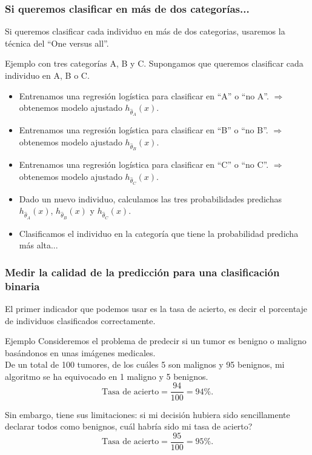 \documentclass{beamer}
\begin{document}
\begin{frame}\frametitle{Si queremos clasificar en más de dos categorías...}
  Si queremos clasificar cada individuo en más de dos categorias, usaremos la técnica del ``One versus all''.\\ 
  {\footnotesize
  \begin{block}{Ejemplo con tres categorías A, B y C.}
    Supongamos que queremos clasificar cada individuo en A, B o C.
    \begin{itemize}
    \item<3-> Entrenamos una regresión logística para clasificar en ``A'' o ``no A''. $\Rightarrow$ obtenemos modelo ajustado $h_{\hat{\theta}_{A}}(x)$.
    \item<4-> Entrenamos una regresión logística para clasificar en ``B'' o ``no B''. $\Rightarrow$ obtenemos modelo ajustado $h_{\hat{\theta}_{B}}(x)$.
    \item<5-> Entrenamos una regresión logística para clasificar en ``C'' o ``no C''. $\Rightarrow$ obtenemos modelo ajustado $h_{\hat{\theta}_{C}}(x)$.
    \item<6-> Dado un nuevo individuo, calculamos las tres probabilidades predichas $h_{\hat{\theta}_{A}}(x)$, $h_{\hat{\theta}_{B}}(x)$ y $h_{\hat{\theta}_{C}}(x)$.
    \item<7-> Clasificamos el individuo en la categoría que tiene la probabilidad predicha más alta...
    \end{itemize}
  \end{block}
  }
\end{frame}
\begin{frame}
  \frametitle{Medir la calidad de la predicción para una clasificación
    binaria}
  El primer indicador que podemos usar es la \alert{tasa de acierto}, es
    decir el porcentaje de individuos clasificados correctamente.
 
  \footnotesize
  \begin{block}{Ejemplo}
  Consideremos el problema de predecir si un tumor es benigno o
  maligno basándonos en unas imágenes medicales. \\ 
  De un total de 100 tumores, de los cuáles 5 son malignos y 95
  benignos, mi algoritmo se ha equivocado en 1 maligno y 5 benignos.
  $$\mbox{Tasa de acierto} = \frac {94} {100} = 94\%.$$
\end{block}
Sin embargo, tiene sus limitaciones: si mi decisión hubiera sido
sencillamente declarar todos como benignos, cuál habría sido mi tasa
de acierto? 
  $$\mbox{Tasa de acierto} = \frac {95} {100} = 95\%.$$


\end{frame}
\end{document}
